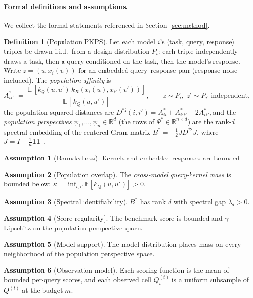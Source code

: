 \documentclass{article}
\theoremstyle{definition}
\newtheorem{definition}{Definition}
\newtheorem{assumption}{Assumption}
\theoremstyle{plain}
\newcommand{\PKPS}{PKPS\xspace}
\begin{document}
\paragraph{Formal definitions and assumptions.} We collect the formal statements referenced in Section~\ref{sec:method}.
\begin{definition}[Population \PKPS]
\label{def:pop}
Let each model $i$'s (task, query, response) triples be drawn i.i.d.\ from a design
distribution $P_i$: each triple independently draws a task, then a query conditioned on
the task, then the model's response. Write $z=(u,x_i(u))$ for an embedded
query--response pair (response noise included). The \emph{population affinity} is
\[
A^*_{ii'}\;=\;\frac{\mathbb{E}\,[k_Q(u,u')\,k_R(x_i(u),x_{i'}(u'))]}{\mathbb{E}\,[k_Q(u,u')]},
\qquad z\sim P_i,\; z'\sim P_{i'} \text{ independent},
\]
the population squared distances are $D^{*2}(i,i')=A^*_{ii}+A^*_{i'i'}-2A^*_{ii'}$, and
the \emph{population perspectives} $\psi_1,\dots,\psi_n\in\mathbb{R}^d$ (the rows of
$\Psi^*\in\mathbb{R}^{n\times d}$) are the rank-$d$ spectral embedding of the centered
Gram matrix $B^*=-\tfrac12 J D^{*2} J$, where $J=I-\tfrac1n\mathbf{1}\mathbf{1}^\top$.
\end{definition}
\begin{assumption}[Boundedness]\label{ass:bound}
Kernels and embedded responses are bounded.
\end{assumption}
\begin{assumption}[Population overlap]\label{ass:overlap}
The \emph{cross-model query-kernel mass} is bounded below:
$\kappa=\inf_{i,i'}\mathbb{E}[k_Q(u,u')]>0$.
\end{assumption}
\begin{assumption}[Spectral identifiability]\label{ass:spec}
$B^*$ has rank $d$ with spectral gap $\lambda_d>0$.
\end{assumption}
\begin{assumption}[Score regularity]\label{ass:score}
The benchmark score is bounded and $\gamma$-Lipschitz on the population perspective space.
\end{assumption}
\begin{assumption}[Model support]\label{ass:support}
The model distribution places mass on every neighborhood of the population perspective
space.
\end{assumption}
\begin{assumption}[Observation model]\label{ass:noise}
Each scoring function is the mean of bounded per-query scores, and each observed cell
$Q_{i}^{(t)}$ is a uniform subsample of $Q^{(t)}$ at the budget $m$.
\end{assumption}
\end{document}
